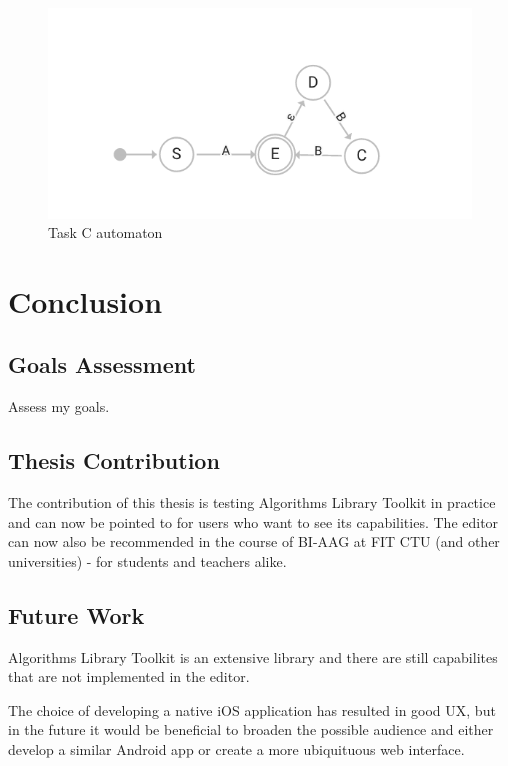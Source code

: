 \begin{figure}
    \includegraphics[width=\textwidth]{epsilon_automaton}
    \caption{Task C automaton}\label{task-c-automaton}
\end{figure}

\chapter{Conclusion}

\section{Goals Assessment}

Assess my goals.

\section{Thesis Contribution}

The contribution of this thesis is testing Algorithms Library Toolkit in practice and can now be pointed to for users who want to see its capabilities. The editor can now also be recommended in the course of BI-AAG at FIT CTU (and other universities) - for students and teachers alike.

\section{Future Work}

Algorithms Library Toolkit is an extensive library and there are still capabilites that are not implemented in the editor.

The choice of developing a native iOS application has resulted in good UX, but in the future it would be beneficial to broaden the possible audience and either develop a similar Android app or create a more ubiquituous web interface.
